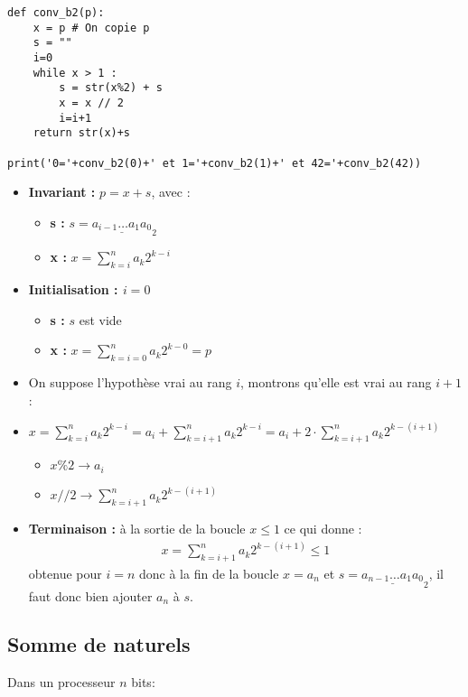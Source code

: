 \begin{lstlisting}
def conv_b2(p):
    x = p # On copie p
    s = ""
    i=0
    while x > 1 : 
        s = str(x%2) + s
        x = x // 2
        i=i+1
    return str(x)+s

print('0='+conv_b2(0)+' et 1='+conv_b2(1)+' et 42='+conv_b2(42))
\end{lstlisting}
\begin{itemize}
\item \textbf{Invariant : } $p=x+s$, avec : 
\begin{itemize}
\item \textbf{s : } $s=\underline{a_{i-1}\dots a_1a_0}_2$
\item \textbf{x : } $x=\displaystyle{\sum_{k=i}^n a_k2^{k-i}}$
\end{itemize}
\item \textbf{Initialisation : $i=0$}
\begin{itemize}
\item \textbf{s : } $s$ est vide
\item \textbf{x : } $x=\displaystyle{\sum_{k=i=0}^n a_k2^{k-0}=p}$
\end{itemize}
\item On suppose l'hypothèse vrai au rang $i$, montrons qu'elle est vrai au rang $i+1$ : 
\item $x=\displaystyle{\sum_{k=i}^n a_k2^{k-i}=a_i+\sum_{k=i+1}^n a_k2^{k-i}=a_i+2\cdot \sum_{k=i+1}^n a_k2^{k-(i+1)}}$
\begin{itemize}
\item $x\%2\rightarrow a_i$
\item $x//2\rightarrow \displaystyle{\sum_{k=i+1}^n a_k2^{k-(i+1)}}$
\end{itemize}
\item \textbf{Terminaison : }
à la sortie de la boucle $x\leq 1$ ce qui donne :
\begin{align*}
x=\displaystyle{\sum_{k=i+1}^n a_k2^{k-(i+1)}}\leq 1
\end{align*}
obtenue pour $i=n$ donc à la fin de la boucle $x=a_n$ et $s=\underline{a_{n-1}\dots a_1a_0}_2$, il faut donc bien ajouter $a_n$ à $s$.
\end{itemize}

\subsection*{Somme de naturels}
\sloppy

Dans un processeur $n$ bits:


